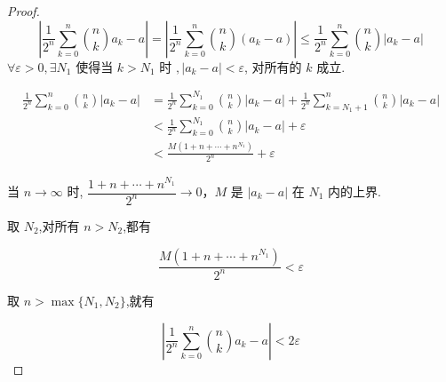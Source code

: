 \begin{proof}
	
	$$ \left| \dfrac{1}{2^n} \sum_{k=0}^{n} {n \choose k} a_k - a \right| = \left| \dfrac{1}{2^n} \sum_{k=0}^{n} {n \choose k} (a_k - a) \right| \leqslant \dfrac{1}{2^n} \sum_{k=0}^{n} {n \choose k} |a_k - a| $$
	$\forall \varepsilon > 0, \exists N_1 \text{ 使得当 } k > N_1 \text{ 时 }, |a_k - a| < \varepsilon$, 对所有的 $k$ 成立.
	
	\begin{align*}
		\frac{1}{2^n} \sum_{k=0}^{n} {n \choose k} |a_k - a| &= \frac{1}{2^n} \sum_{k=0}^{N_1} {n \choose k} |a_k - a| + \frac{1}{2^n} \sum_{k=N_1+1}^{n} {n \choose k} |a_k - a| \\
		&< \frac{1}{2^n} \sum_{k=0}^{N_1} {n \choose k} |a_k - a| + \varepsilon \\
		&< \frac{M (1 + n + \cdots + n^{N_1})}{2^n} + \varepsilon
	\end{align*}
	
	当 $n \to \infty$ 时, $\dfrac{1 + n + \cdots + n^{N_1}}{2^n} \to 0$，$M$ 是 $|a_k - a|$ 在 $N_1$ 内的上界.
	
	取 $N_2$,对所有 $n > N_2$,都有
	
	$$ \frac{M (1 + n + \cdots + n^{N_1})}{2^n} < \varepsilon $$
	
	取 $n > \max\{N_1, N_2\}$,就有
	
	$$ \left| \frac{1}{2^n} \sum_{k=0}^{n} {n \choose k} a_k - a \right| < 2\varepsilon $$
	
\end{proof}







